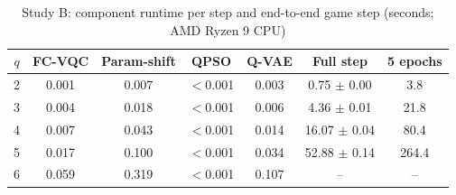 \documentclass[conference]{IEEEtran}
\begin{document}
\begin{table}[t]
\centering
\caption{Study B: component runtime per step and end-to-end game step (seconds; AMD Ryzen 9 CPU)}
\label{tab:runtime}
\footnotesize
\setlength{\tabcolsep}{3pt}
\begin{tabular}{ccccccc}
\toprule
$q$ & FC-VQC & Param-shift & QPSO & Q-VAE & Full step & 5 epochs\\
\midrule
2 & 0.001 & 0.007 & $<$0.001 & 0.003 & 0.75 $\pm$ 0.00 & 3.8\\
3 & 0.004 & 0.018 & $<$0.001 & 0.006 & 4.36 $\pm$ 0.01 & 21.8\\
4 & 0.007 & 0.043 & $<$0.001 & 0.014 & 16.07 $\pm$ 0.04 & 80.4\\
5 & 0.017 & 0.100 & $<$0.001 & 0.034 & 52.88 $\pm$ 0.14 & 264.4\\
6 & 0.059 & 0.319 & $<$0.001 & 0.107 & -- & --\\
\bottomrule
\end{tabular}
\end{table}

\end{document}
